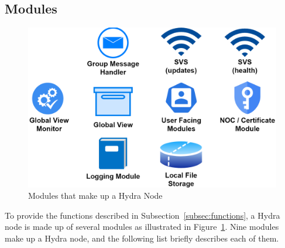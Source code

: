 \subsection{Modules} \label{subsec:modules}
\begin{figure}[!ht]
    \centering
    \includegraphics[width=\columnwidth]{visuals/node-modules.png}
    \caption{Modules that make up a Hydra Node}
    \label{fig:node-modules}
\end{figure}

To provide the functions described in Subsection~\ref{subsec:functions}, a Hydra node is made up of several modules as illustrated in  Figure~\ref{fig:node-modules}. Nine modules make up a Hydra node, and the following list briefly describes each of them. 


